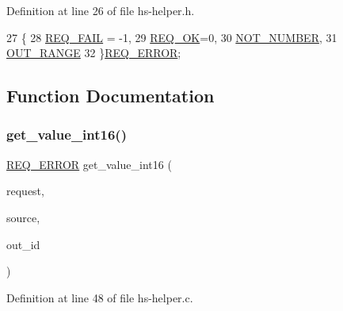 Definition at line 26 of file hs-\/helper.\+h.


\begin{DoxyCode}
27 \{
28   \hyperlink{hs-helper_8h_aa49f1dbbf26f01627a5737cf43aad899a96a855966bc63045222b3dcac524cee1}{REQ\_FAIL} = -1,
29   \hyperlink{hs-helper_8h_aa49f1dbbf26f01627a5737cf43aad899ab093abb14c097b3b7719debb04d5e8ee}{REQ\_OK}=0,
30   \hyperlink{hs-helper_8h_aa49f1dbbf26f01627a5737cf43aad899aa223eed65c9bee2bf1f4cdecaf90d66a}{NOT\_NUMBER},
31   \hyperlink{hs-helper_8h_aa49f1dbbf26f01627a5737cf43aad899add1c84bf80c5f80741ee8f37fef1e12b}{OUT\_RANGE}
32 \}\hyperlink{hs-helper_8h_aa49f1dbbf26f01627a5737cf43aad899}{REQ\_ERROR};
\end{DoxyCode}


\subsection{Function Documentation}
\mbox{\label{hs-helper_8h_a2e62366684e39ea94436bf017e416827}} 
\subsubsection{\texorpdfstring{get\+\_\+value\+\_\+int16()}{get\_value\_int16()}}
{\footnotesize\ttfamily \hyperlink{hs-helper_8h_aa49f1dbbf26f01627a5737cf43aad899}{R\+E\+Q\+\_\+\+E\+R\+R\+OR} get\+\_\+value\+\_\+int16 (\begin{DoxyParamCaption}\item[{const struct afb\+\_\+req}]{request,  }\item[{const char $\ast$}]{source,  }\item[{int16\+\_\+t $\ast$}]{out\+\_\+id }\end{DoxyParamCaption})}



Definition at line 48 of file hs-\/helper.\+c.


